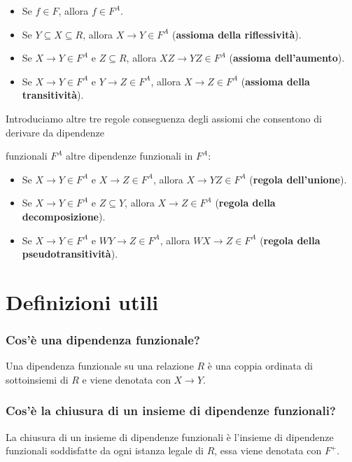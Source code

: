 \documentclass{article}
\begin{document}
\begin{itemize}
  \item Se $f\in F$, allora $f\in F^A$.
  \item Se $Y\subseteq X\subseteq R$, allora $X\to Y\in F^A$ (\textbf{assioma della riflessività}).
  \item Se $X\to Y\in F^A$ e $Z\subseteq R$, allora $XZ\to YZ\in F^A$ (\textbf{assioma dell'aumento}).
  \item Se $X\to Y\in F^A$ e $Y\to Z\in F^A$, allora $X\to Z\in F^A$ (\textbf{assioma della transitività}).
\end{itemize}

Introduciamo altre tre regole conseguenza degli assiomi che consentono di derivare da dipendenze \par funzionali $F^A$ altre dipendenze funzionali in $F^A$:

\begin{itemize}
  \item Se $X\to Y\in F^A$ e $X\to Z\in F^A$, allora $X \to YZ\in F^A$ (\textbf{regola dell'unione}).
  \item Se $X\to Y\in F^A$ e $Z\subseteq Y$, allora $X \to Z\in F^A$ (\textbf{regola della decomposizione}).
  \item Se $X\to Y\in F^A$ e $WY\to Z\in F^A$, allora $WX\to Z\in F^A$ (\textbf{regola della pseudotransitività}).
\end{itemize}






\pagebreak

\section{Definizioni utili}
\subsubsection{Cos'è una dipendenza funzionale?}
Una dipendenza funzionale su una relazione $R$ è una coppia ordinata di sottoinsiemi di $R$ e viene denotata con $X \rightarrow Y$.\\

\subsubsection{Cos'è la chiusura di un insieme di dipendenze funzionali?}
La chiusura di un insieme di dipendenze funzionali è l'insieme di dipendenze funzionali soddisfatte da ogni istanza legale di $R$, essa viene denotata con $F^+$.\\
\end{document}

